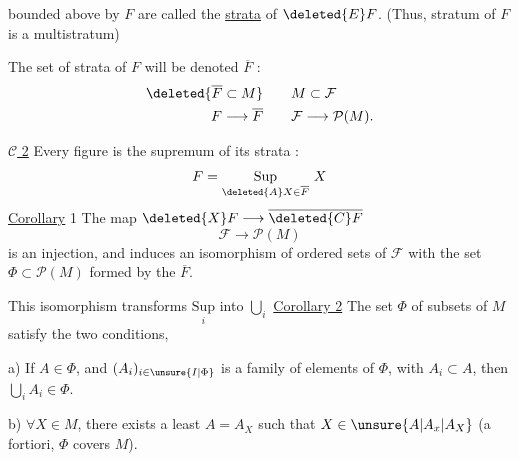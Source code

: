 
bounded above by $F$ are called the \uline{strata} of $\deleted{E}F$. (Thus,  stratum of $F$ is a multistratum)

The set of strata of $F$  will be denoted $\overline F$ : \[ \begin{aligned} \deleted{\overline F\subset M} &\qquad  M\subset\mathcal F\\ F\longrightarrow\overline F &\qquad \mathcal F\longrightarrow\mathcal P( M). \end{aligned} \]

\uline{$\mathcal C$ 2} Every figure is the supremum of its strata : \[ F=\underset{\deleted{A}X\in\overline F}{\mathrm{Sup}}\ X \]
\uline{Corollary} 1 The map $\deleted{X}F\longrightarrow\overline{\deleted{C}F}$ \[ \mathcal F\longrightarrow\mathcal P( M) \] is an injection, and induces an isomorphism of ordered sets of $\mathcal F$ with the set $\Phi\subset\mathcal P( M)$ formed by the $\overline F$.

This isomorphism transforms $\underset{i}{\mathrm{Sup}}$ into $\bigcup_i$
\uline{Corollary 2} The set $\Phi$ of subsets of $ M$ satisfy the two conditions,


 a) If $A\in\Phi$, and $(A_i)_{i\in\unsure{I|\Phi}}$ is a family of elements of $\Phi$, with $A_i\subset A$, then $\bigcup_iA_i\in\Phi$.

b) $\forall X\in M$, there exists a least $A=A_X$ such that $X\in\unsure{A|A_x|A_X}$ (a fortiori, $\Phi$ covers $ M$).
